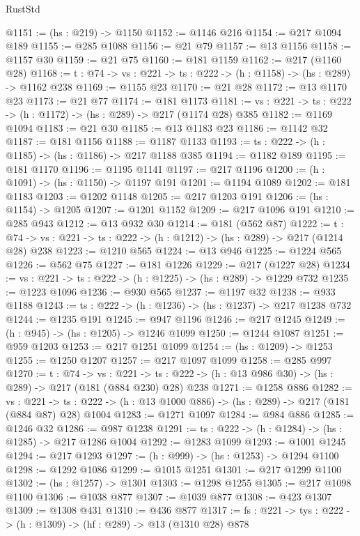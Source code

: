 \begin{lexlean}{RustStd}
\begin{coremodule}
{\begin{coremodule}
{{{@1151 := (hs : @219) -> @1150
@1152 := @1146 @216
@1154 := @217 @1094 @189
@1155 := @285 @1088
@1156 := @21 @79
@1157 := @13 @1156
@1158 := @1157 @30
@1159 := @21 @75
@1160 := @181 @1159
@1162 := @217 (@1160 @28)
@1168 := {t : @74} -> {vs : @221} -> {ts : @222} -> (h : @1158) -> (hs : @289) -> @1162 @238
@1169 := @1155 @23
@1170 := @21 @28
@1172 := @13 @1170 @23
@1173 := @21 @77
@1174 := @181 @1173
@1181 := {vs : @221} -> {ts : @222} -> (h : @1172) -> (hs : @289) -> @217 (@1174 @28) @385
@1182 := @1169 @1094
@1183 := @21 @30
@1185 := @13 @1183 @23
@1186 := @1142 @32
@1187 := @181 @1156
@1188 := @1187 @1133
@1193 := {ts : @222} -> (h : @1185) -> (hs : @1186) -> @217 @1188 @385
@1194 := @1182 @189
@1195 := @181 @1170
@1196 := @1195 @1141
@1197 := @217 @1196
@1200 := (h : @1091) -> (hs : @1150) -> @1197 @191
@1201 := @1194 @1089
@1202 := @181 @1183
@1203 := @1202 @1148
@1205 := @217 @1203 @191
@1206 := (hs : @1154) -> @1205
@1207 := @1201 @1152
@1209 := @217 @1096 @191
@1210 := @285 @943
@1212 := @13 @932 @30
@1214 := @181 (@562 @87)
@1222 := {t : @74} ->
  {vs : @221} -> {ts : @222} -> (h : @1212) -> (hs : @289) -> @217 (@1214 @28) @238
@1223 := @1210 @565
@1224 := @13 @946
@1225 := @1224 @565
@1226 := @562 @75
@1227 := @181 @1226
@1229 := @217 (@1227 @28)
@1234 := {vs : @221} -> {ts : @222} -> (h : @1225) -> (hs : @289) -> @1229 @732
@1235 := @1223 @1096
@1236 := @930 @565
@1237 := @1197 @32
@1238 := @933 @1188
@1243 := {ts : @222} -> (h : @1236) -> (hs : @1237) -> @217 @1238 @732
@1244 := @1235 @191
@1245 := @947 @1196
@1246 := @217 @1245
@1249 := (h : @945) -> (hs : @1205) -> @1246 @1099
@1250 := @1244 @1087
@1251 := @959 @1203
@1253 := @217 @1251 @1099
@1254 := (hs : @1209) -> @1253
@1255 := @1250 @1207
@1257 := @217 @1097 @1099
@1258 := @285 @997
@1270 := {t : @74} ->
  {vs : @221} ->
  {ts : @222} -> (h : @13 @986 @30) -> (hs : @289) -> @217 (@181 (@884 @230) @28) @238
@1271 := @1258 @886
@1282 := {vs : @221} ->
  {ts : @222} -> (h : @13 @1000 @886) -> (hs : @289) -> @217 (@181 (@884 @87) @28) @1004
@1283 := @1271 @1097
@1284 := @984 @886
@1285 := @1246 @32
@1286 := @987 @1238
@1291 := {ts : @222} -> (h : @1284) -> (hs : @1285) -> @217 @1286 @1004
@1292 := @1283 @1099
@1293 := @1001 @1245
@1294 := @217 @1293
@1297 := (h : @999) -> (hs : @1253) -> @1294 @1100
@1298 := @1292 @1086
@1299 := @1015 @1251
@1301 := @217 @1299 @1100
@1302 := (hs : @1257) -> @1301
@1303 := @1298 @1255
@1305 := @217 @1098 @1100
@1306 := @1038 @877
@1307 := @1039 @877
@1308 := @423 @1307
@1309 := @1308 @431
@1310 := @436 @877
@1317 := {fs : @221} -> {tys : @222} -> (h : @1309) -> (hf : @289) -> @13 (@1310 @28) @878
}}}
\end{coremodule}}
\end{coremodule}
\end{lexlean}
